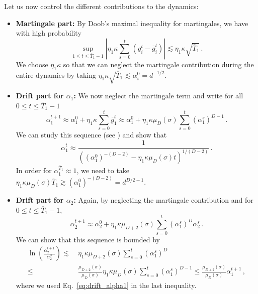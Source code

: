 \documentclass[11pt]{article}
\newcommand{\<}{\langle}
\renewcommand{\>}{\rangle}
\theoremstyle{definition}
\def\og{\overline{g}}
\def\oT{\overline{T}}
\begin{document}
Let us now control the different contributions to the dynamics:
\begin{itemize}
    \item[(i)] \textbf{Martingale part:} By Doob's maximal inequality for martingales, we have with high probability
    \[
    \sup_{1 \leq t \leq \oT_1 -1} \left\vert \eta_1 \kappa \sum_{s = 0}^t  (g_i^t - \og_i^t) \right\vert \lesssim \eta_1 \kappa \sqrt{\oT_1} \, .
    \]
    We choose $\eta_1 \kappa$ so that we can neglect the martingale contribution during the entire dynamics by taking $\eta_1 \kappa \sqrt{\oT_1} \lesssim \alpha_i^0 = d^{-1/2}$.

    \item[(ii)] \textbf{Drift part for $\alpha_1$:} We now neglect the martingale term and write for all $0 \leq t  \leq \oT_1 -1$
    \begin{equation}\label{eq:drift_alpha1}
    \alpha_1^{t+1} \approx \alpha_1^0 + \eta_1 \kappa \sum_{s=0}^t \og_1^t \approx \alpha_1^0 + \eta_1 \kappa \mu_D (\sigma) \sum_{s=0}^t (\alpha_1^s)^{D-1} \, .
    \end{equation}
    We can study this sequence (see \cite{arous2021online}) and show that
    \[
    \alpha_1^{t} \approx \frac{1}{ \left( (\alpha_1^0)^{-(D-2)} - \eta_1 \kappa \mu_D (\sigma) t \right)^{1/(D-2)}} \, .
    \]
    In order for $\alpha^{\oT_1}_1 \approx 1$, we need to take $\eta_1 \kappa \mu_D (\sigma ) \oT_1 \gtrsim (\alpha_1^0)^{-(D-2)} = d^{D/2 - 1}$.

    \item[(iii)] \textbf{Drift part for $\alpha_2$:} Again, by neglecting the martingale contribution and for $0 \leq t \leq \oT_1 - 1$,
    \[
    \alpha_2^{t+1} \approx \alpha_2^0 + \eta_1 \kappa \mu_{D+2} (\sigma)  \sum_{s=0}^t (\alpha_1^s)^{D} \alpha_2^s \, .
    \]
    We can show that this sequence is bounded by
    \begin{equation}\label{eq:alpha2_bound}
    \begin{aligned}
    \ln \left( \frac{\alpha_2^{t+1}}{\alpha_2^0} \right) \lesssim&~ \eta_1 \kappa \mu_{D+2} (\sigma)  \sum_{s=0}^t (\alpha_1^s)^{D}\\
    \leq&~ \frac{\mu_{D+2} (\sigma)}{\mu_D (\sigma)} \eta_1 \kappa \mu_D (\sigma) \sum_{s=0}^t (\alpha_1^s)^{D-1} \leq \frac{\mu_{D+2} (\sigma)}{\mu_D (\sigma)} \alpha^{t+1}_1 \, ,
    \end{aligned}
    \end{equation}
    where we used Eq.~\eqref{eq:drift_alpha1} in the last inequality. 
\end{itemize}
\end{document}
